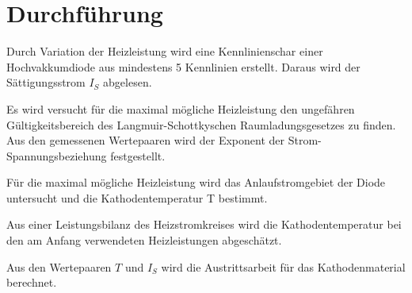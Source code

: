 \section{Durchführung}
\label{sec:Durchführung}

Durch Variation der Heizleistung wird eine Kennlinienschar einer Hochvakkumdiode aus mindestens 5 Kennlinien erstellt. Daraus wird der Sättigungsstrom $I_S$ abgelesen. 

Es wird versucht für die maximal mögliche Heizleistung den ungefähren Gültigkeitsbereich des Langmuir-Schottkyschen Raumladungsgesetzes zu finden. 
Aus den gemessenen Wertepaaren wird der Exponent der Strom-Spannungsbeziehung festgestellt. 

Für die maximal mögliche Heizleistung wird das Anlaufstromgebiet der Diode untersucht und die Kathodentemperatur T bestimmt. 

Aus einer Leistungsbilanz des Heizstromkreises wird die Kathodentemperatur bei den am Anfang verwendeten Heizleistungen abgeschätzt. 

Aus den Wertepaaren $T$ und $I_S$ wird die Austrittsarbeit für das Kathodenmaterial berechnet. 
